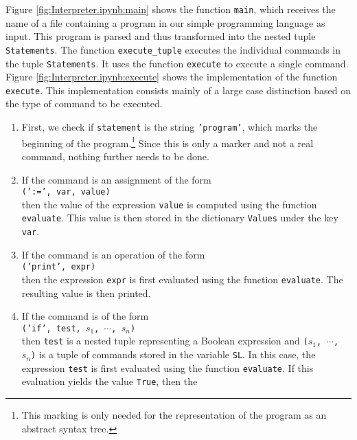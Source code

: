 Figure \ref{fig:Interpreter.ipynb:main} shows the function \texttt{main}, which receives the name of a
file containing a program in our simple programming language as input. This program is parsed and
thus transformed into the nested tuple \texttt{Statements}. The function \texttt{execute\_tuple} executes
the individual commands in the tuple \texttt{Statements}. It uses the function \texttt{execute} to
execute a single command. Figure \ref{fig:Interpreter.ipynb:execute} shows the
implementation of the function \texttt{execute}. This implementation consists mainly of a large
case distinction based on the type of command to be executed.
\begin{enumerate}
\item First, we check if \texttt{statement} is the string \texttt{'program'}, which marks the beginning of
      the program.\footnote{
        This marking is only needed for the representation of the program as an abstract syntax tree.}
      Since this is only a marker and not a real command, nothing further needs to be
      done.
\item If the command is an assignment of the form
      \\[0.2cm]
      \hspace*{1.3cm}
      \texttt{(':=', var, value)}
      \\[0.2cm]   
      then the value of the expression \texttt{value} is computed using the function \texttt{evaluate}.
      This value is then stored in the dictionary \texttt{Values} under the key \texttt{var}.
\item If the command is an operation of the form
      \\[0.2cm]
      \hspace*{1.3cm}
      \texttt{('print', expr)}
      \\[0.2cm]
      then the expression \texttt{expr} is first evaluated using the function \texttt{evaluate}.
      The resulting value is then printed.
\item If the command is of the form
      \\[0.2cm]
      \hspace*{1.3cm}
      \texttt{('if', test, $s_1$, $\cdots$, $s_n$)}
      \\[0.2cm]
      then \texttt{test} is a nested tuple representing a Boolean expression and
      \texttt{($s_1$, $\cdots$, $s_n$)} is a tuple of commands stored in the variable \texttt{SL}.
      In this case, the expression \texttt{test} is first evaluated using the function \texttt{evaluate}.
      If this evaluation yields the value \texttt{True}, then the

\end{enumerate}
